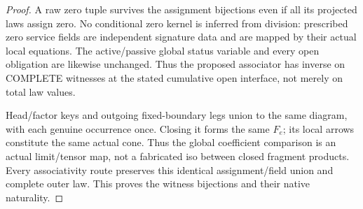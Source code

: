 \documentclass[11pt]{article}\usepackage{amsmath,amssymb,amsthm}
\begin{document}
\begin{proof}
A raw zero tuple survives the assignment bijections even if all its projected laws assign zero. No conditional zero kernel is inferred from division: prescribed zero service fields are independent signature data and are mapped by their actual local equations. The active/passive global status variable and every open obligation are likewise unchanged. Thus the proposed associator has inverse on COMPLETE witnesses at the stated cumulative open interface, not merely on total law values.

Head/factor keys and outgoing fixed-boundary legs union to the same diagram, with each genuine occurrence once. Closing it forms the same $F_e$; its local arrows constitute the same actual cone. Thus the global coefficient comparison is an actual limit/tensor map, not a fabricated iso between closed fragment products. Every associativity route preserves this identical assignment/field union and complete outer law. This proves the witness bijections and their native naturality.\end{proof}
\end{document}
